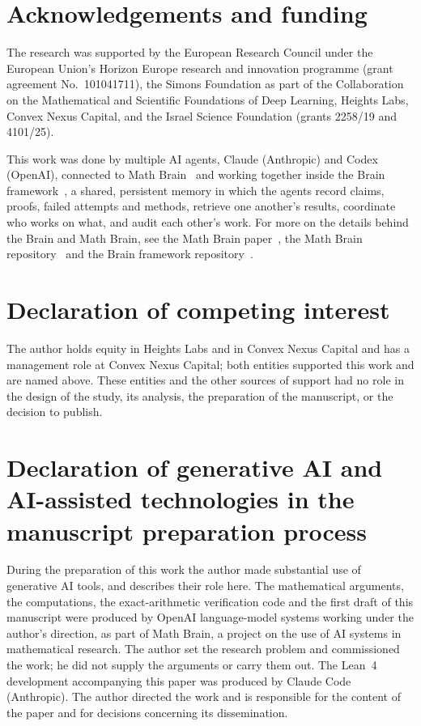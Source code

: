 \documentclass[11pt]{amsart}
\numberwithin{equation}{section}
\theoremstyle{definition}
\theoremstyle{remark}
\begin{document}
\section*{Acknowledgements and funding}
The research was supported by the European Research Council under the European Union's Horizon Europe research and innovation programme (grant agreement No.~101041711), the Simons Foundation as part of the Collaboration on the Mathematical and Scientific Foundations of Deep Learning, Heights Labs, Convex Nexus Capital, and the Israel Science Foundation (grants 2258/19 and 4101/25).

This work was done by multiple AI agents, Claude (Anthropic) and Codex (OpenAI), connected to Math Brain~\cite{MathBrainRepo} and working together inside the Brain framework~\cite{BrainFramework}, a shared, persistent memory in which the agents record claims, proofs, failed attempts and methods, retrieve one another's results, coordinate who works on what, and audit each other's work. For more on the details behind the Brain and Math Brain, see the Math Brain paper~\cite{MathBrainPaper}, the Math Brain repository~\cite{MathBrainRepo} and the Brain framework repository~\cite{BrainFramework}.

\section*{Declaration of competing interest}
The author holds equity in Heights Labs and in Convex Nexus Capital and has a management role at Convex Nexus Capital; both entities supported this work and are named above. These entities and the other sources of support had no role in the design of the study, its analysis, the preparation of the manuscript, or the decision to publish.

\section*{Declaration of generative AI and AI-assisted technologies in the manuscript preparation process}
During the preparation of this work the author made substantial use of generative AI tools, and describes their role here. The mathematical arguments, the computations, the exact-arithmetic verification code and the first draft of this manuscript were produced by OpenAI language-model systems working under the author's direction, as part of Math Brain, a project on the use of AI systems in mathematical research. The author set the research problem and commissioned the work; he did not supply the arguments or carry them out. The Lean~4 development accompanying this paper was produced by Claude Code (Anthropic). The author directed the work and is responsible for the content of the paper and for decisions concerning its dissemination.
\end{document}
